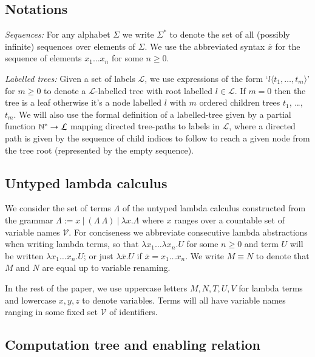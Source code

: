\documentclass{elsarticle}
\theoremstyle{plain}
\theoremstyle{definition}
\theoremstyle{remark}
\newcommand\VarSet{\mathcal{V}}
\newcommand{\alphaequiv}{\equiv}
\begin{document}
\subsection{Notations}
\emph{Sequences:} For any alphabet $\Sigma$ we write $\Sigma^*$ to denote the set of all (possibly infinite) sequences over elements of $\Sigma$.
 We use the abbreviated syntax $\overline{x}$ for the sequence of elements $x_1 \ldots x_n$ for some $n\geq0$.

 \emph{Labelled trees:} Given a set of labels $\mathcal{L}$, we use expressions of the form `$l\langle t_1, \ldots, t_m \rangle$' for $m \geq 0$ to denote a $\mathcal{L}$-labelled tree with root labelled $l\in \mathcal{L}$. If $m=0$ then the tree is a leaf otherwise it's a node labelled $l$ with $m$ ordered children trees $t_1$, \ldots, $t_m$. We will also use the formal definition of a labelled-tree given by a partial function $\mathbb{N}^* \rightarrow \mathcal{L}$ mapping directed tree-paths to labels in $\mathcal{L}$, where
 a directed path is given by the sequence of child indices to follow to reach a given node from the tree root (represented by the empty sequence).

\subsection{Untyped lambda calculus}
We consider the set of terms $\Lambda$ of the untyped lambda calculus constructed from the grammar $\Lambda := x\ |\ (\Lambda\ \Lambda)\ |\ \lambda x. \Lambda $
where $x$ ranges over a countable set of variable names $\VarSet$.
For conciseness we abbreviate consecutive lambda abstractions when writing lambda terms, so that $\lambda x_1 \ldots \lambda x_n . U$ for some $n\geq 0$ and term $U$ will be written $\lambda x_1 \ldots x_n . U$; or just
$\lambda \overline{x} . U$ if $\overline{x} = x_1 \ldots x_n$. We write $M \alphaequiv N$ to denote that $M$ and $N$ are equal up to variable renaming.

In the rest of the paper, we use uppercase letters $M, N, T, U, V$ for lambda terms and lowercase $x,y,z$ to denote variables. Terms will all have variable names ranging in some fixed set $\VarSet$ of identifiers.

\subsection{Computation tree and enabling relation}
\end{document}
